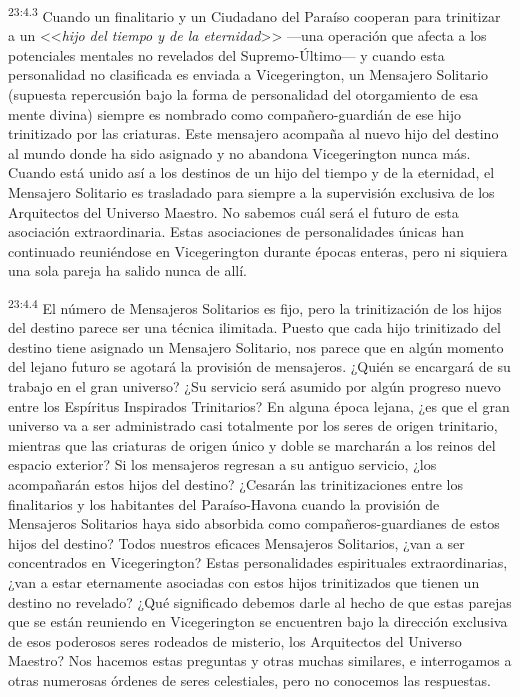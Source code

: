 \par
\textsuperscript{23:4.3} Cuando un finalitario y un Ciudadano del Paraíso cooperan para trinitizar a un <<\textit{hijo del tiempo y de la eternidad}>> ---una operación que afecta a los potenciales mentales no revelados del Supremo-Último--- y cuando esta personalidad no clasificada es enviada a Vicegerington, un Mensajero Solitario (supuesta repercusión bajo la forma de personalidad del otorgamiento de esa mente divina) siempre es nombrado como compañero-guardián de ese hijo trinitizado por las criaturas. Este mensajero acompaña al nuevo hijo del destino al mundo donde ha sido asignado y no abandona Vicegerington nunca más. Cuando está unido así a los destinos de un hijo del tiempo y de la eternidad, el Mensajero Solitario es trasladado para siempre a la supervisión exclusiva de los Arquitectos del Universo Maestro. No sabemos cuál será el futuro de esta asociación extraordinaria. Estas asociaciones de personalidades únicas han continuado reuniéndose en Vicegerington durante épocas enteras, pero ni siquiera una sola pareja ha salido nunca de allí.

\par
\textsuperscript{23:4.4} El número de Mensajeros Solitarios es fijo, pero la trinitización de los hijos del destino parece ser una técnica ilimitada. Puesto que cada hijo trinitizado del destino tiene asignado un Mensajero Solitario, nos parece que en algún momento del lejano futuro se agotará la provisión de mensajeros. ¿Quién se encargará de su trabajo en el gran universo? ¿Su servicio será asumido por algún progreso nuevo entre los Espíritus Inspirados Trinitarios? En alguna época lejana, ¿es que el gran universo va a ser administrado casi totalmente por los seres de origen trinitario, mientras que las criaturas de origen único y doble se marcharán a los reinos del espacio exterior? Si los mensajeros regresan a su antiguo servicio, ¿los acompañarán estos hijos del destino? ¿Cesarán las trinitizaciones entre los finalitarios y los habitantes del Paraíso-Havona cuando la provisión de Mensajeros Solitarios haya sido absorbida como compañeros-guardianes de estos hijos del destino? Todos nuestros eficaces Mensajeros Solitarios, ¿van a ser concentrados en Vicegerington? Estas personalidades espirituales extraordinarias, ¿van a estar eternamente asociadas con estos hijos trinitizados que tienen un destino no revelado? ¿Qué significado debemos darle al hecho de que estas parejas que se están reuniendo en Vicegerington se encuentren bajo la dirección exclusiva de esos poderosos seres rodeados de misterio, los Arquitectos del Universo Maestro? Nos hacemos estas preguntas y otras muchas similares, e interrogamos a otras numerosas órdenes de seres celestiales, pero no conocemos las respuestas.

